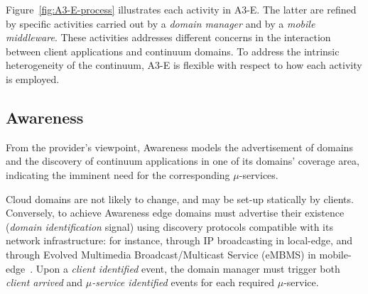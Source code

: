 Figure~\ref{fig:A3-E-process} illustrates each activity in A3-E. The latter are refined by specific activities carried out by a \textit{domain manager} and by a \textit{mobile middleware}. These activities addresses different concerns in the interaction between client applications and continuum domains. 
To address the intrinsic heterogeneity of the continuum, A3-E is flexible with respect to how each activity is employed.






\subsection{Awareness}\label{sec:A3-E-awareness}

From the provider's viewpoint, Awareness models the advertisement of domains and the discovery of continuum applications in one of its domains' coverage area, indicating the imminent need for the corresponding $\mu$-services. 


Cloud domains are not likely to change, 
and may be set-up statically by clients.
Conversely, to achieve Awareness edge domains must advertise their existence (\textit{domain identification} signal) using discovery protocols compatible with its network infrastructure: for instance, through IP broadcasting in local-edge, and through Evolved Multimedia Broadcast/Multicast Service (eMBMS) in mobile-edge~\cite{ETSI:MEC:ARCHITECTURE,lecompte2012evolved}. 
Upon a \textit{client identified} event, the domain manager must trigger both \textit{client arrived} and \textit{$\mu$-service identified} events for each required $\mu$-service.

